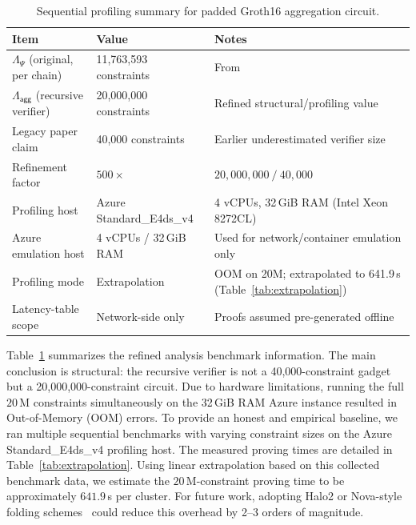 \documentclass[journal]{IEEEtran}
\newcommand{\aggCircuit}{\Lambda_{\mathsf{agg}}}
\begin{document}
\begin{table}[t]
\centering
\caption{Sequential profiling summary for padded Groth16 aggregation circuit.}
\label{tab:circuit}
\begin{tabular}{ll p{6cm}} %
\toprule
Item & Value & Notes \\
\midrule
$\Lambda_\Psi$ (original, per chain)    & 11,763,593 constraints & From~\cite{guo2024zkcross} \\
$\aggCircuit$ (recursive verifier)      & 20,000,000 constraints & Refined structural/profiling value \\
Legacy paper claim                      & 40,000 constraints     & Earlier underestimated verifier size \\
Refinement factor                       & $500\times$            & $20{,}000{,}000\ /\ 40{,}000$ \\
Profiling host                          & Azure Standard\_E4ds\_v4 & 4 vCPUs, 32\,GiB RAM (Intel Xeon 8272CL) \\
Azure emulation host                    & 4 vCPUs / 32\,GiB RAM  & Used for network/container emulation only \\
Profiling mode                          & Extrapolation          & OOM on 20M; extrapolated to 641.9\,s (Table~\ref{tab:extrapolation}) \\
Latency-table scope                     & Network-side only      & Proofs assumed pre-generated offline \\
\bottomrule
\end{tabular}
\end{table}


Table~\ref{tab:circuit} summarizes the refined analysis benchmark information. The main conclusion is structural: the recursive verifier is not a 40,000-constraint gadget but a 20,000,000-constraint circuit. Due to hardware limitations, running the full $20\,$M constraints simultaneously on the 32\,GiB RAM Azure instance resulted in Out-of-Memory (OOM) errors. To provide an honest and empirical baseline, we ran multiple sequential benchmarks with varying constraint sizes on the Azure Standard\_E4ds\_v4 profiling host. The measured proving times are detailed in Table~\ref{tab:extrapolation}. Using linear extrapolation based on this collected benchmark data, we estimate the $20\,$M-constraint proving time to be approximately $641.9\,$s per cluster. For future work, adopting Halo2 or Nova-style folding schemes~\cite{rosenberg2024hekaton} could reduce this overhead by 2--3 orders of magnitude.
\end{document}
